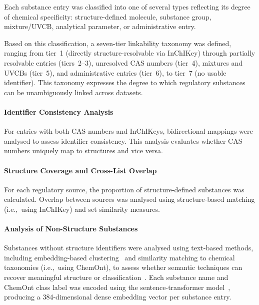 Each substance entry was classified into one of several types reflecting its degree of chemical specificity: structure-defined molecule, substance group, mixture/UVCB, analytical parameter, or administrative entry.

Based on this classification, a seven-tier linkability taxonomy was defined, ranging from tier~1 (directly structure-resolvable via InChIKey) through partially resolvable entries (tiers~2--3), unresolved CAS numbers (tier~4), mixtures and UVCBs (tier~5), and administrative entries (tier~6), to tier~7 (no usable identifier). This taxonomy expresses the degree to which regulatory substances can be unambiguously linked across datasets.

\paragraph{Identifier Consistency Analysis}

For entries with both CAS numbers and InChIKeys, bidirectional mappings were analysed to assess identifier consistency. This analysis evaluates whether CAS numbers uniquely map to structures and vice versa.

\paragraph{Structure Coverage and Cross-List Overlap}

For each regulatory source, the proportion of structure-defined substances was calculated. Overlap between sources was analysed using structure-based matching (i.e.,~using InChIKey) and set similarity measures.

\paragraph{Analysis of Non-Structure Substances}

Substances without structure identifiers were analysed using text-based methods, including embedding-based clustering~\cite{Rousseeuw1987,Lloyd1982,McInnes2018} and similarity matching to chemical taxonomies (i.e.,~using ChemOnt), to assess whether semantic techniques can recover meaningful structure or classification~\cite{Manning2008,DjoumbouFeunang2016}. Each substance name and ChemOnt class label was encoded using the  sentence-transformer model~\cite{Reimers2019,Wang2020MiniLM,devlin-etal-2019-bert}, producing a 384-dimensional dense embedding vector per substance entry.

